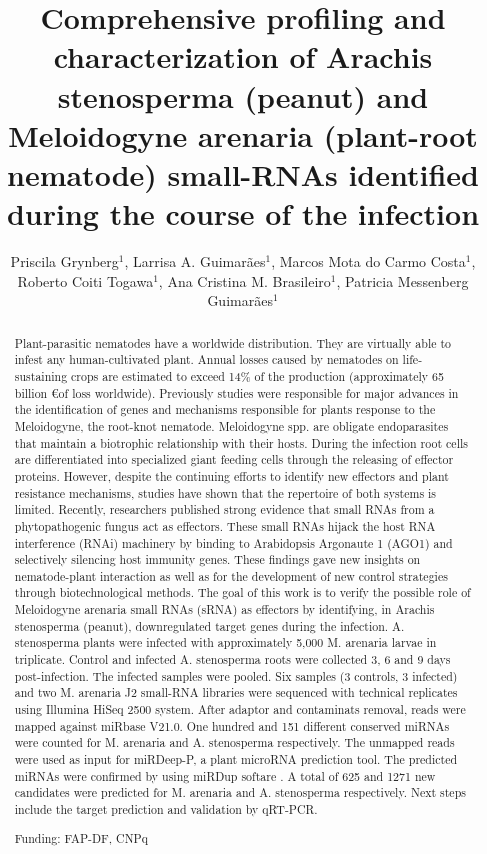 \documentclass[twoside]{article}
\title{\vspace{-15mm}\fontsize{24pt}{10pt}\selectfont\textbf{Comprehensive profiling and characterization of  Arachis stenosperma (peanut) and Meloidogyne arenaria (plant-root nematode) small-RNAs identified during the course of the infection}} %
\author{Priscila Grynberg$^1$, Larrisa A. Guimar\~aes$^1$, Marcos Mota do Carmo Costa$^1$, Roberto Coiti Togawa$^1$, Ana Cristina M. Brasileiro$^1$, Patricia Messenberg Guimar\~aes$^1$}
\affil{1 EMBRAPA RECURSOS GEN\'ETICOS E BIOTECNOLOGIA\\ }
\date{}
\begin{document}
\maketitle %

\thispagestyle{fancy} %


\begin{abstract}
Plant-parasitic nematodes have a worldwide distribution. They are virtually able to infest any human-cultivated plant. Annual losses caused by nematodes on life-sustaining crops are estimated to exceed 14\% of the production (approximately 65 billion \euro  of loss worldwide). Previously studies were responsible for major advances in the identification of genes and mechanisms responsible for plants response to the Meloidogyne, the root-knot nematode. Meloidogyne spp. are obligate endoparasites that maintain a biotrophic relationship with their hosts. During the infection root cells are differentiated into specialized giant feeding cells through the releasing of effector proteins. However, despite the continuing efforts to identify new effectors and plant resistance mechanisms, studies have shown that the repertoire of both systems is limited. Recently, researchers published strong evidence that small RNAs from a phytopathogenic fungus act as effectors. These small RNAs hijack the host RNA interference (RNAi) machinery by binding to Arabidopsis Argonaute 1 (AGO1) and selectively silencing host immunity genes. These findings gave new insights on nematode-plant interaction as well as for the development of new control strategies through biotechnological methods. The goal of this work is to verify the possible role of Meloidogyne arenaria small RNAs (sRNA) as effectors by identifying, in Arachis stenosperma (peanut), downregulated target genes during the infection. A. stenosperma plants were infected with approximately 5,000 M. arenaria larvae in triplicate. Control and infected A. stenosperma roots were collected 3, 6 and 9 days post-infection. The infected samples were pooled. Six samples (3 controls, 3 infected) and two M. arenaria J2 small-RNA libraries were sequenced with technical replicates using Illumina HiSeq 2500 system. After adaptor and contaminats removal, reads were mapped against miRbase V21.0.  One hundred and 151 different conserved miRNAs were counted for M. arenaria and A. stenosperma respectively. The unmapped reads were used as input for miRDeep-P,  a plant microRNA prediction tool. The predicted miRNAs were confirmed by using miRDup softare . A total of 625 and 1271 new candidates were predicted for  M. arenaria and A. stenosperma respectively. Next steps include the target prediction and validation by qRT-PCR.

Funding: FAP-DF, CNPq
\end{abstract}
\end{document}
